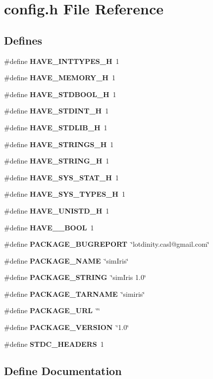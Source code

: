 \section{config.h File Reference}
\label{simIris_2config_8h}
\subsection*{Defines}
\begin{CompactItemize}
\item 
\#define {\bf HAVE\_\-INTTYPES\_\-H}~1
\item 
\#define {\bf HAVE\_\-MEMORY\_\-H}~1
\item 
\#define {\bf HAVE\_\-STDBOOL\_\-H}~1
\item 
\#define {\bf HAVE\_\-STDINT\_\-H}~1
\item 
\#define {\bf HAVE\_\-STDLIB\_\-H}~1
\item 
\#define {\bf HAVE\_\-STRINGS\_\-H}~1
\item 
\#define {\bf HAVE\_\-STRING\_\-H}~1
\item 
\#define {\bf HAVE\_\-SYS\_\-STAT\_\-H}~1
\item 
\#define {\bf HAVE\_\-SYS\_\-TYPES\_\-H}~1
\item 
\#define {\bf HAVE\_\-UNISTD\_\-H}~1
\item 
\#define {\bf HAVE\_\-\_\-BOOL}~1
\item 
\#define {\bf PACKAGE\_\-BUGREPORT}~\char`\"{}lotdinity.casl@gmail.com\char`\"{}
\item 
\#define {\bf PACKAGE\_\-NAME}~\char`\"{}simIris\char`\"{}
\item 
\#define {\bf PACKAGE\_\-STRING}~\char`\"{}simIris 1.0\char`\"{}
\item 
\#define {\bf PACKAGE\_\-TARNAME}~\char`\"{}simiris\char`\"{}
\item 
\#define {\bf PACKAGE\_\-URL}~\char`\"{}\char`\"{}
\item 
\#define {\bf PACKAGE\_\-VERSION}~\char`\"{}1.0\char`\"{}
\item 
\#define {\bf STDC\_\-HEADERS}~1
\end{CompactItemize}


\subsection{Define Documentation}

